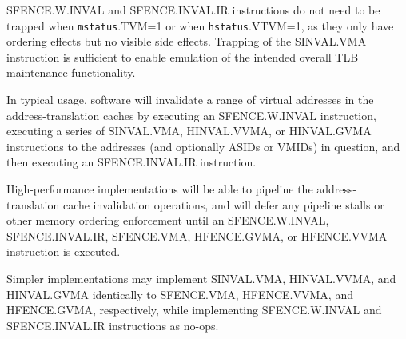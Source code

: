 \begin{commentary}
  SFENCE.W.INVAL and SFENCE.INVAL.IR instructions do not need to be trapped when
  {\tt mstatus}.TVM=1 or when {\tt hstatus}.VTVM=1, as they only have ordering
  effects but no visible side effects.  Trapping of the SINVAL.VMA instruction
  is sufficient to enable emulation of the intended overall TLB maintenance
  functionality.

  In typical usage, software will invalidate a range of virtual addresses in
  the address-translation caches by executing an SFENCE.W.INVAL instruction,
  executing a series of SINVAL.VMA, HINVAL.VVMA, or HINVAL.GVMA instructions to
  the addresses (and optionally ASIDs or VMIDs) in question, and then executing
  an SFENCE.INVAL.IR instruction.

  High-performance implementations will be able to pipeline the
  address-translation cache invalidation operations, and will defer any
  pipeline stalls or other memory ordering enforcement until an SFENCE.W.INVAL,
  SFENCE.INVAL.IR, SFENCE.VMA, HFENCE.GVMA, or HFENCE.VVMA instruction is
  executed.

  Simpler implementations may implement SINVAL.VMA, HINVAL.VVMA, and
  HINVAL.GVMA identically to SFENCE.VMA, HFENCE.VVMA, and HFENCE.GVMA,
  respectively, while implementing SFENCE.W.INVAL and SFENCE.INVAL.IR
  instructions as no-ops.
\end{commentary}

